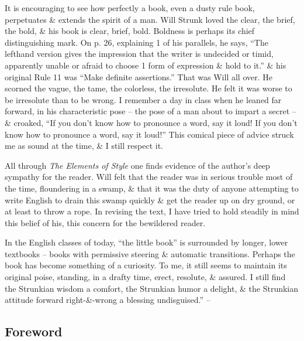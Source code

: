 \documentclass{article}
\begin{document}
It is encouraging to see how perfectly a book, even a dusty rule book, perpetuates \& extends the spirit of a man. Will Strunk loved the clear, the brief, the bold, \& his book is clear, brief, bold. Boldness is perhaps its chief distinguishing mark. On p. 26, explaining 1 of his parallels, he says, ``The lefthand version gives the impression that the writer is undecided or timid, apparently unable or afraid to choose 1 form of expression \& hold to it.'' \& his original Rule 11 was ``Make definite assertions.'' That was Will all over. He scorned the vague, the tame, the colorless, the irresolute. He felt it was worse to be irresolute than to be wrong. I remember a day in class when he leaned far forward, in his characteristic pose -- the pose of a man about to impart a secret -- \& croaked, ``If you don't know how to pronounce a word, say it loud! If you don't know how to pronounce a word, say it loud!'' This comical piece of advice struck me as sound at the time, \& I still respect it. 

All through {\it The Elements of Style} one finds evidence of the author's deep sympathy for the reader. Will felt that the reader was in serious trouble most of the time, floundering in a swamp, \& that it was the duty of anyone attempting to write English to drain this swamp quickly \& get the reader up on dry ground, or at least to throw a rope. In revising the text, I have tried to hold steadily in mind this belief of his, this concern for the bewildered reader.

In the English classes of today, ``the little book'' is surrounded by longer, lower textbooks -- books with permissive steering \& automatic transitions. Perhaps the book has become something of a curiosity. To me, it still seems to maintain its original poise, standing, in a drafty time, erect, resolute, \& assured. I still find the Strunkian wisdom a comfort, the Strunkian humor a delight, \& the Strunkian attitude forward right-\&-wrong a blessing undisguised.'' -- \cite[Introduction (by E. B. White)]{Strunk_White2019}


\subsection*{Foreword}

\end{document}
